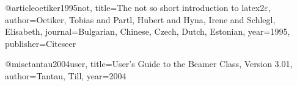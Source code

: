 @article{oetiker1995not,
	title={The not so short introduction to latex2$\varepsilon$},
	author={Oetiker, Tobias and Partl, Hubert and Hyna, Irene and Schlegl, Elisabeth},
	journal={Bulgarian, Chinese, Czech, Dutch, Estonian},
	year={1995},
	publisher={Citeseer}
}

@misc{tantau2004user,
	title={User’s Guide to the Beamer Class, Version 3.01},
	author={Tantau, Till},
	year={2004}
}